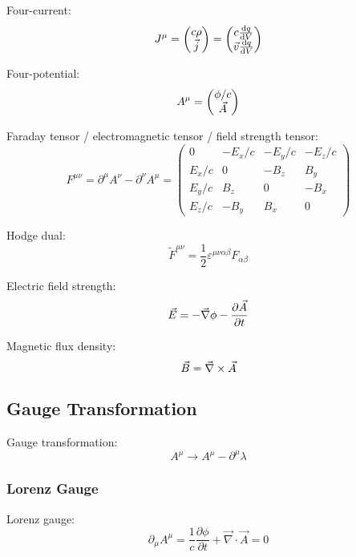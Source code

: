 		\noindent
		Four-current:
		\begin{equation}
			J^\mu = \left(\begin{matrix}c\rho\\\vec{j}\end{matrix}\right) = \left(\begin{matrix}c\dv{q}{V}\\\vec{v}\dv{q}{V}\end{matrix}\right)
		\end{equation}

		\noindent
		Four-potential:
		\begin{equation}
			A^\mu = \left(\begin{matrix}\phi/c\\\vec{A}\end{matrix}\right)
		\end{equation}

		\noindent
		Faraday tensor / electromagnetic tensor / field strength tensor:
		\begin{equation}
			F^{\mu\nu} = \partial^\mu A^\nu - \partial^\nu A^\mu
			= \left( \begin{matrix}
				0 & -E_x/c & -E_y/c & -E_z/c \\
				E_x/c & 0 & -B_z & B_y \\
				E_y/c	& B_z & 0 & -B_x \\
				E_z/c & -B_y & B_x & 0
			\end{matrix} \right)
		\end{equation}

		\noindent
		Hodge dual:
		\begin{equation}
			\tilde{F}^{\mu\nu} = \frac{1}{2}\varepsilon^{\mu\nu\alpha\beta}F_{\alpha\beta}
		\end{equation}

		\noindent
		Electric field strength:
		\begin{equation}
			\vec{E} = -\vec{\nabla}\phi-\pdv{\vec{A}}{t}
		\end{equation}

		\noindent
		Magnetic flux density:
		\begin{equation}
			\vec{B} = \vec{\nabla}\times\vec{A}
		\end{equation}

	\subsection{Gauge Transformation}
		\noindent
		Gauge transformation:
		\begin{equation}
			A^\mu \rightarrow A^\mu-\partial^\mu \lambda
		\end{equation}

		\subsubsection{Lorenz Gauge}
			\noindent
			Lorenz gauge:
			\begin{equation}
				\partial_\mu A^\mu = \frac{1}{c}\frac{\partial \phi}{\partial t} + \vec{\nabla}\cdot\vec{A} = 0
			\end{equation}

